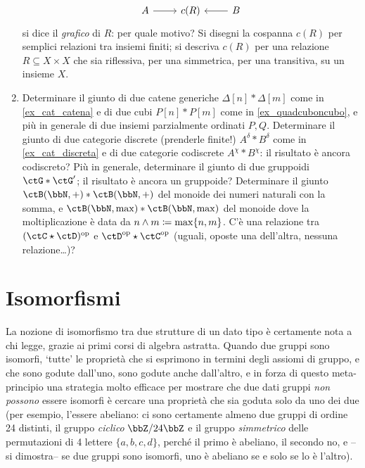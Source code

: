 \begin{enumerate}
\[\begin{tikzcd}
  A \ar[r] & c(R) & \ar[l] B 
\end{tikzcd}
\]
si dice il \emph{grafico} di $R$: per quale motivo? Si disegni la cospanna $c(R)$ per semplici relazioni tra insiemi finiti; si descriva $c(R)$ per una relazione $R\subseteq X\times X$ che sia riflessiva, per una simmetrica, per una transitiva, su un insieme $X$.
	\item Determinare il giunto di due catene generiche \(\Delta[n] * \Delta[m]\) come in \ref{ex_cat_catena} e di due cubi \(P[n] * P[m]\) come in \ref{ex_quadcuboncubo}, e più in generale di due insiemi parzialmente ordinati \(P,Q\). Determinare il giunto di due categorie discrete (prenderle finite!) \(A^\delta * B^\delta\) come in \ref{ex_cat_discreta} e di due categorie codiscrete \(A^\chi * B^\chi\): il risultato è ancora codiscreto? Più in generale, determinare il giunto di due gruppoidi \(\ctG * \ctG'\); il risultato è ancora un gruppoide? Determinare il giunto \(\ctB(\bbN,+) * \ctB(\bbN,+)\) del monoide dei numeri naturali con la somma, e \(\ctB(\bbN,\max) * \ctB(\bbN,\max)\) del monoide dove la moltiplicazione è data da \(n\land m \coloneqq \max\{n,m\}\). C'è una relazione tra \((\ctC\star\ctD)^\op\) e \(\ctD^\op\star\ctC^\op\) (uguali, oposte una dell'altra, nessuna relazione\dots)?
\end{enumerate}
\section{Isomorfismi}\label{sec_isomorfismi}
La nozione di isomorfismo tra due strutture di un dato tipo è certamente nota a chi legge, grazie ai primi corsi di algebra astratta. Quando due gruppi sono isomorfi, `tutte' le proprietà che si esprimono in termini degli assiomi di gruppo, e che sono godute dall'uno, sono godute anche dall'altro, e in forza di questo meta-principio una strategia molto efficace per mostrare che due dati gruppi \emph{non possono} essere isomorfi è cercare una proprietà che sia goduta solo da uno dei due (per esempio, l'essere abeliano: ci sono certamente almeno due gruppi di ordine 24 distinti, il gruppo \emph{ciclico} \(\bbZ/24\bbZ\) e il gruppo \emph{simmetrico} delle permutazioni di 4 lettere \(\{a,b,c,d\}\), perché il primo è abeliano, il secondo no, e --si dimostra-- se due gruppi sono isomorfi, uno è abeliano se e solo se lo è l'altro).

